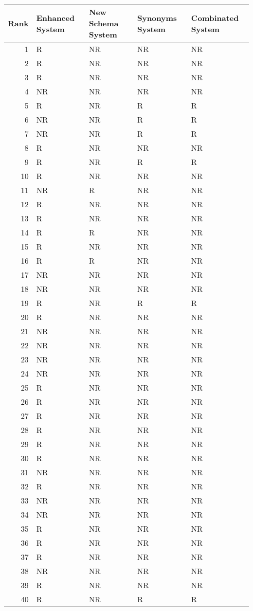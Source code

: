 \begin{tabular}{rllll}
\toprule
Rank & Enhanced System & New Schema System & Synonyms System & Combinated System \\
\midrule
1 & R & NR & NR & NR \\
2 & R & NR & NR & NR \\
3 & R & NR & NR & NR \\
4 & NR & NR & NR & NR \\
5 & R & NR & R & R \\
6 & NR & NR & R & R \\
7 & NR & NR & R & R \\
8 & R & NR & NR & NR \\
9 & R & NR & R & R \\
10 & R & NR & NR & NR \\
11 & NR & R & NR & NR \\
12 & R & NR & NR & NR \\
13 & R & NR & NR & NR \\
14 & R & R & NR & NR \\
15 & R & NR & NR & NR \\
16 & R & R & NR & NR \\
17 & NR & NR & NR & NR \\
18 & NR & NR & NR & NR \\
19 & R & NR & R & R \\
20 & R & NR & NR & NR \\
21 & NR & NR & NR & NR \\
22 & NR & NR & NR & NR \\
23 & NR & NR & NR & NR \\
24 & NR & NR & NR & NR \\
25 & R & NR & NR & NR \\
26 & R & NR & NR & NR \\
27 & R & NR & NR & NR \\
28 & R & NR & NR & NR \\
29 & R & NR & NR & NR \\
30 & R & NR & NR & NR \\
31 & NR & NR & NR & NR \\
32 & R & NR & NR & NR \\
33 & NR & NR & NR & NR \\
34 & NR & NR & NR & NR \\
35 & R & NR & NR & NR \\
36 & R & NR & NR & NR \\
37 & R & NR & NR & NR \\
38 & NR & NR & NR & NR \\
39 & R & NR & NR & NR \\
40 & R & NR & R & R \\
\bottomrule
\end{tabular}
